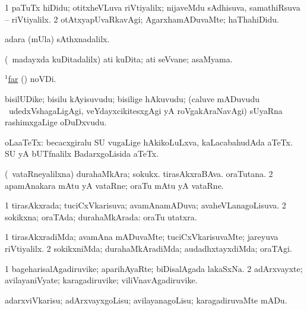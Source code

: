 \bentry
{}
\gl{\kirxvi}
\bmng
\bnum
\num{1} paTuTx hiDidu; otitxheVLuva riVtiyalilx; nijaveMdu sAdhisuva, samathiRsuva -- riVtiyalilx. 
\num{2} otAtxyapUvaRkavAgi; AgarxhamADuvaMte; haThahiDidu. 
\enum
\emng
\eentry

\bentry
{}
\gl{\kirxvi}
\expl{\Latin}
\bmng
 adara (mUla) sAthxnadalilx. 
\emng
\eentry

\bentry
{}
\gl{\nA}
\bmng
(\kanmu\ madayxda kuDitadalilx) ati kuDita; ati seVvane; asaMyama. 
\emng
\eentry

\bentry
{}
\gl{\kirxvi}
\bmng
\hyperref{kandict_f.pdf}{F}{far pagu}{$^1$far} (\pagu) noVDi. 
\emng
\eentry

\bentry
{}
\gl{\nA}
\bmng
bisilUDike; bisilu kAyisuvudu; bisilige hAkuvudu; (caluve mADuvudu \mo\ udedxVshagaLigAgi, veYdayxcikitesxgAgi yA roVgakAraNavAgi) sUyaRna rashimxgaLige oDuDxvudu. 
\emng
\eentry

\bentry
{}
\gl{\nA}
\bmng
oLaaTeTx: 
\banum
{} becacxgiralu SU \mo vugaLige hAkikoLuLxva, kaLacabahudAda aTeTx. 
 SU yA bUTfnalilx BadarxgoLisida aTeTx. 
\eanum
\emng
\eentry

\bentry
{}
\gl{\nA}
\bmng
\bnum
{} (\kanmu\ vataRneyalilxna) 
\banum
{} durahaMkAra; sokukx. 
 tirasAkxraBAva. 
 oraTutana. 
\eanum
\numie
\num{2} apamAnakara mAtu yA vataRne; oraTu mAtu yA vataRne. 
\enum
\emng
\eentry

\bentry
{}
\gl{\gu}
\bmng
\bnum
\num{1} tirasAkxrada; tuciCxVkarisuva; avamAnamADuva; avaheVLanagoLisuva. 
\num{2} sokikxna; oraTAda; durahaMkArada:  oraTu utatxra. 
\enum
\emng
\eentry

\bentry
{}
\gl{\kirxvi}
\bmng
\bnum
\num{1} tirasAkxradiMda; avamAna mADuvaMte; tuciCxVkarisuvaMte; jareyuva riVtiyalilx. 
\num{2} sokikxniMda; durahaMkAradiMda; audadhxtayxdiMda; oraTAgi. 
\enum
\emng
\eentry

\bentry
{}
\gl{\nA}
\bmng
\bnum
\num{1} bageharisalAgadiruvike; aparihAyaRte; biDisalAgada lakaSxNa. 
\num{2} adArxvayxte; avilayaniVyate; karagadiruvike; viliVnavAgadiruvike. 
\enum
\emng
\eentry

\bentry
{}
\gl{\sakirx}
\bmng
adarxviVkarisu; adArxvayxgoLisu; avilayanagoLisu; karagadiruvaMte mADu. 
\emng
\eentry

